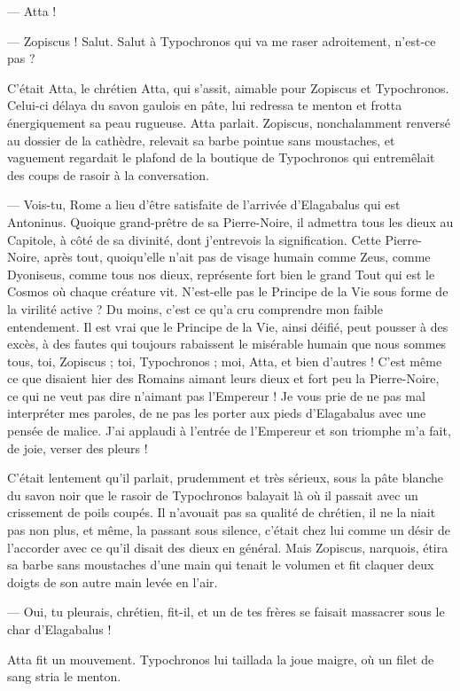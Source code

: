 \documentclass[a4paper, 11pt, oneside, polutonikogreek, french]{article}
\begin{document}
--- Atta !

--- Zopiscus ! Salut. Salut à Typochronos qui va me raser adroitement, n'est-ce pas ?

C'était Atta, le chrétien Atta, qui s'assit, aimable pour Zopiscus et Typochronos. Celui-ci délaya du savon gaulois en pâte, lui redressa te menton et frotta énergiquement sa peau rugueuse. Atta parlait. Zopiscus, nonchalamment renversé au dossier de la cathèdre, relevait sa barbe pointue sans moustaches, et vaguement regardait le plafond de la boutique de Typochronos qui entremêlait des coups de rasoir à la conversation.

--- Vois-tu, Rome a lieu d'être satisfaite de l'arrivée d'Elagabalus qui est Antoninus. Quoique grand-prêtre de sa Pierre-Noire, il admettra tous les dieux au Capitole, à côté de sa divinité, dont j'entrevois la signification. Cette Pierre-Noire, après tout, quoiqu'elle n'ait pas de visage humain comme Zeus, comme Dyoniseus, comme tous nos dieux, représente fort bien le grand Tout qui est le Cosmos où chaque créature vit. N'est-elle pas le Principe de la Vie sous forme de la virilité active ? Du moins, c'est ce qu'a cru comprendre mon faible entendement. Il est vrai que le Principe de la Vie, ainsi déifié, peut pousser à des excès, à des fautes qui toujours rabaissent le misérable humain que nous sommes tous, toi, Zopiscus ; toi, Typochronos ; moi, Atta, et bien d'autres ! C'est même ce que disaient hier des Romains aimant leurs dieux et fort peu la Pierre-Noire, ce qui ne veut pas dire n'aimant pas l'Empereur ! Je vous prie de ne pas mal interpréter mes paroles, de ne pas les porter aux pieds d'Elagabalus avec une pensée de malice. J'ai applaudi à l'entrée de l'Empereur et son triomphe m'a fait, de joie, verser des pleurs !

C'était lentement qu'il parlait, prudemment et très sérieux, sous la pâte blanche du savon noir que le rasoir de Typochronos balayait là où il passait avec un crissement de poils coupés. Il n'avouait pas sa qualité de chrétien, il ne la niait pas non plus, et même, la passant sous silence, c'était chez lui comme un désir de l'accorder avec ce qu'il disait des dieux en général. Mais Zopiscus, narquois, étira sa barbe sans moustaches d'une main qui tenait le volumen et fit claquer deux doigts de son autre main levée en l'air.

--- Oui, tu pleurais, chrétien, fit-il, et un de tes frères se faisait massacrer sous le char d'Elagabalus !

Atta fit un mouvement. Typochronos lui taillada la joue maigre, où un filet de sang stria le menton.
\end{document}
